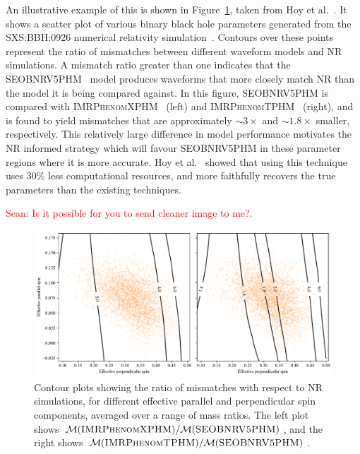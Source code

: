 \documentclass{ucdgradtaughtthesis}
\newcommand{\Sean}[1]{{\textcolor{red}{{Sean: #1}} }}
\begin{document}
An illustrative example of this is shown in Figure~\ref{fig:projectmotivation}, taken from Hoy et al.~\cite{Ogpaper}. It shows a scatter plot of various binary black hole parameters generated from the \textsc{SXS:BBH:0926} numerical relativity simulation~\cite{NRsimulation}. 
Contours over these points represent the ratio of mismatches between different waveform models and NR simulations.
A mismatch ratio greater than one indicates that the \textsc{SEOBNRV5PHM}~\cite{bestNRfitS} model produces waveforms that more closely match NR than the model it is being compared against.
In this figure, \textsc{SEOBNRV5PHM} is compared with \textsc{IMRPhenomXPHM}~\cite{NRfitMP} (left) and \textsc{IMRPhenomTPHM}~\cite{NRfitMT} (right), 
and is found to yield mismatches that are approximately \( \sim 3\times \) and \( \sim 1.8\times \) smaller, respectively.
This relatively large difference in model performance motivates the NR informed strategy
which will favour \textsc{SEOBNRV5PHM} in these parameter regions where it is more accurate. 
Hoy et al.~\cite{Ogpaper} showed that using this technique uses 30\% less computational resources, and more faithfully recovers the true parameters than
the existing techniques.
%

\Sean{Is it possible for you to send cleaner image to me?.}
\begin{figure}[H]
    \centering
    \includegraphics[width=\textwidth]{LatexPlots/HoyFigure2.pdf}
    \caption[Motivating the NR Bayesian Method.]{Contour plots showing the ratio of mismatches with respect to NR simulations, for different effective parallel and perpendicular spin components, averaged over a range of mass ratios. 
    The left plot shows \( \mathcal{M}(\textsc{IMRPhenomXPHM}) / \mathcal{M}(\textsc{SEOBNRV5PHM}) \), and the right shows \( \mathcal{M}(\textsc{IMRPhenomTPHM}) / \mathcal{M}(\textsc{SEOBNRV5PHM}) \).}
    \label{fig:projectmotivation}
\end{figure}
\end{document}
